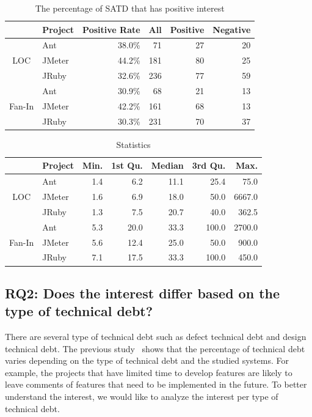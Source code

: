 \begin{table}[tb]
  \caption{The percentage of SATD that has positive interest}
  \label{tab:percentage}
  \centering

  \begin{tabular}{cl|r|rrr}
  \hline
      &  Project & Positive Rate & All & Positive & Negative \\
  \hline
        & Ant    & 38.0\% &  71 &  27  &  20 \\
   LOC  & JMeter & 44.2\% & 181 &  80  &  25 \\
        & JRuby  & 32.6\% & 236 &  77  &  59 \\
  \hline
        & Ant    & 30.9\% &  68 &  21  &  13 \\
Fan-In  & JMeter & 42.2\% & 161 &  68  &  13 \\
        & JRuby  & 30.3\% & 231 &  70  &  37 \\
  \hline
  \end{tabular}
\end{table}

\begin{table}[tb]
  \caption{Statistics}
  \label{tab:statistic}
  \centering

  \begin{tabular}{cl|rrrrr}
  \hline
      &  Project & Min. & 1st Qu. & Median & 3rd Qu. & Max. \\
  \hline
        & Ant    & 1.4 &   6.2 &  11.1  &   25.4 &   75.0 \\
   LOC  & JMeter & 1.6 &   6.9 &  18.0  &   50.0 & 6667.0 \\
        & JRuby  & 1.3 &   7.5 &  20.7  &   40.0 &  362.5 \\
  \hline
        & Ant    & 5.3 &  20.0 &  33.3  &  100.0 & 2700.0 \\
Fan-In  & JMeter & 5.6 &  12.4 &  25.0  &   50.0 &  900.0 \\
        & JRuby  & 7.1 &  17.5 &  33.3  &  100.0 &  450.0 \\
  \hline
  \end{tabular}
\end{table}


\subsection{RQ2: Does the interest differ based on the type of technical debt?}
There are several type of technical debt such as defect technical debt and design technical debt.
The previous study~\cite{Maldonado2015MTD} shows that the percentage of technical debt varies depending on the type of technical debt and the studied systems. For example, the projects that have limited time to develop features are likely to leave comments of features that need to be implemented in the future. 
To better understand the interest, we would like to analyze the interest per type of technical debt.



